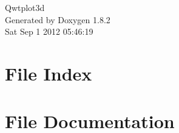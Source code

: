 \documentclass{book}
\begin{document}
\hypersetup{pageanchor=false,citecolor=blue}
\begin{titlepage}
\vspace*{7cm}
\begin{center}
{\Large Qwtplot3d }\\
\vspace*{1cm}
{\large Generated by Doxygen 1.8.2}\\
\vspace*{0.5cm}
{\small Sat Sep 1 2012 05:46:19}\\
\end{center}
\end{titlepage}
\clearemptydoublepage
{}
\tableofcontents
\clearemptydoublepage
{}
\hypersetup{pageanchor=true,citecolor=blue}
\chapter{File Index}

\chapter{File Documentation}
























\printindex
\end{document}
